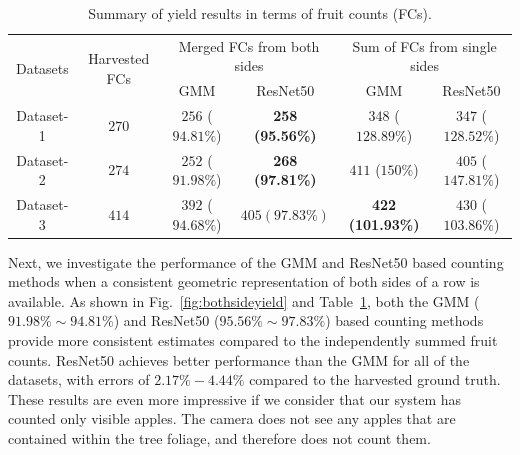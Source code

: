 \begin{table}[!htb]
    \caption{Summary of yield results in terms of fruit counts (FCs).} \label{tab:yield}
    
    \small
        \begin{tabular}{|c|c|c|c|c|c|}
            \hline
            \multirow{2}{*}{Datasets} & \multirow{2}{*}{Harvested FCs} & \multicolumn{2}{|c|}{Merged FCs from both sides} & \multicolumn{2}{|c|}{Sum of FCs from single sides}\\
            \cline{3-6}
            & & GMM & ResNet50 & GMM & ResNet50\\
            \hline
            Dataset-1 & $270$ & $256$ ($94.81\%$) & \textbf{258 (95.56\%)} & $348$ ($128.89\%$) & $347$ ($128.52\%$)\\
            \hline
            Dataset-2 & $274$ & $252$ ($91.98\%$) & \textbf{268 (97.81\%)} & $411$ ($150\%$) & $405$ ($147.81\%$)\\
            \hline
            Dataset-3 & $414$ & $392$ ($94.68\%$) & $405 (97.83\%)$ & 
            \textbf{422 (101.93\%)} & $430$ ($103.86\%$)\\
            \hline
        \end{tabular}
    
\end{table}

Next, we investigate the performance of the GMM and ResNet50 based counting methods when a consistent geometric representation of both sides of a row is available. As shown in Fig.~\ref{fig:bothsideyield} and Table~\ref{tab:yield}, both the GMM ($91.98\%\sim94.81\%$) and ResNet50 ($95.56\%\sim97.83\%$) based counting methods provide more consistent estimates compared to the independently summed fruit counts. ResNet50 achieves better performance than the GMM for all of the datasets, with errors of $2.17\% - 4.44\%$ compared to the harvested ground truth. These results are even more impressive if we consider that our system has counted only visible apples. The camera does not see any apples that are contained within the tree foliage, and therefore does not count them.

